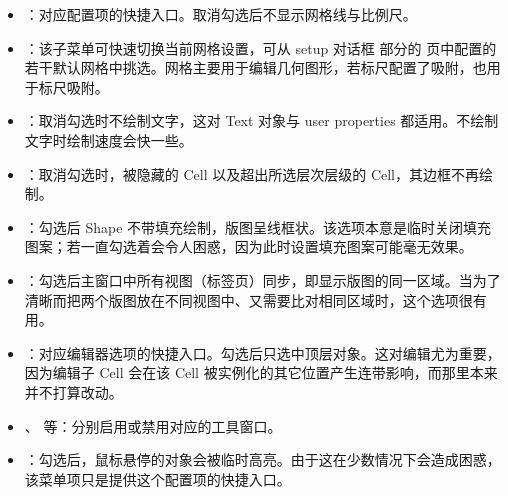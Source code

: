 \begin{itemize}
\item {}：对应配置项的快捷入口。取消勾选后不显示网格线与比例尺。
\item {}：该子菜单可快速切换当前网格设置，可从 setup 对话框  部分的  页中配置的若干默认网格中挑选。网格主要用于编辑几何图形，若标尺配置了吸附，也用于标尺吸附。
\item {}：取消勾选时不绘制文字，这对 Text 对象与 user properties 都适用。不绘制文字时绘制速度会快一些。
\item {}：取消勾选时，被隐藏的 Cell 以及超出所选层次层级的 Cell，其边框不再绘制。
\item {}：勾选后 Shape 不带填充绘制，版图呈线框状。该选项本意是临时关闭填充图案；若一直勾选着会令人困惑，因为此时设置填充图案可能毫无效果。
\item {}：勾选后主窗口中所有视图（标签页）同步，即显示版图的同一区域。当为了清晰而把两个版图放在不同视图中、又需要比对相同区域时，这个选项很有用。
\item {}：对应编辑器选项的快捷入口。勾选后只选中顶层对象。这对编辑尤为重要，因为编辑子 Cell 会在该 Cell 被实例化的其它位置产生连带影响，而那里本来并不打算改动。
\item {}、 等：分别启用或禁用对应的工具窗口。
\item {}：勾选后，鼠标悬停的对象会被临时高亮。由于这在少数情况下会造成困惑，该菜单项只是提供这个配置项的快捷入口。
\end{itemize}
